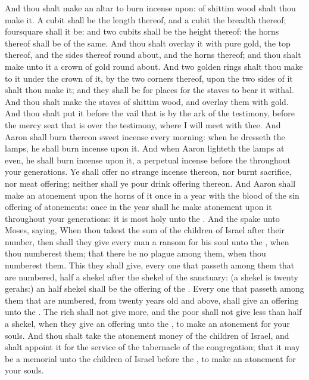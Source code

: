 \begin{biblechapter} %
 And thou shalt make an altar to burn incense upon: of shittim wood shalt thou make it.
\verse A cubit shall be the length thereof, and a cubit the breadth thereof; foursquare shall it be: and two cubits shall be the height thereof: the horns thereof shall be of the same.
\verse And thou shalt overlay it with pure gold, the top thereof, and the sides thereof round about, and the horns thereof; and thou shalt make unto it a crown of gold round about.
\verse And two golden rings shalt thou make to it under the crown of it, by the two corners thereof, upon the two sides of it shalt thou make it; and they shall be for places for the staves to bear it withal.
\verse And thou shalt make the staves of shittim wood, and overlay them with gold.
\verse And thou shalt put it before the vail that is by the ark of the testimony, before the mercy seat that is over the testimony, where I will meet with thee.
\verse And Aaron shall burn thereon sweet incense every morning: when he dresseth the lamps, he shall burn incense upon it.
\verse And when Aaron lighteth the lamps at even, he shall burn incense upon it, a perpetual incense before the \LORD throughout your generations.
\verse Ye shall offer no strange incense thereon, nor burnt sacrifice, nor meat offering; neither shall ye pour drink offering thereon.
\verse And Aaron shall make an atonement upon the horns of it once in a year with the blood of the sin offering of atonements: once in the year shall he make atonement upon it throughout your generations: it is most holy unto the \LORD.
 And the \LORD spake unto Moses, saying,
\verse When thou takest the sum of the children of Israel after their number, then shall they give every man a ransom for his soul unto the \LORD, when thou numberest them; that there be no plague among them, when thou numberest them.
\verse This they shall give, every one that passeth among them that are numbered, half a shekel after the shekel of the sanctuary: (a shekel is twenty gerahs:) an half shekel shall be the offering of the \LORD.
\verse Every one that passeth among them that are numbered, from twenty years old and above, shall give an offering unto the \LORD.
\verse The rich shall not give more, and the poor shall not give less than half a shekel, when they give an offering unto the \LORD, to make an atonement for your souls.
\verse And thou shalt take the atonement money of the children of Israel, and shalt appoint it for the service of the tabernacle of the congregation; that it may be a memorial unto the children of Israel before the \LORD, to make an atonement for your souls.

\end{biblechapter}
